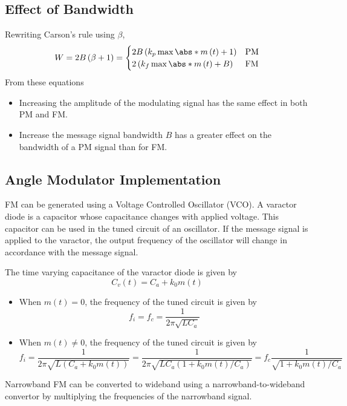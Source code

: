 \documentclass{article}
\begin{document}
\subsection{Effect of Bandwidth}
Rewriting Carson's rule using \(\beta\),
\begin{equation*}
    W = 2B \left( \beta + 1 \right) =
    \begin{cases}
        2B \left( k_p \max{\abs*{m\left( t \right)}} + 1 \right) & \text{PM} \\
        2 \left( k_f \max{\abs*{m\left( t \right)}} + B \right)  & \text{FM}
    \end{cases}
\end{equation*}
From these equations
\begin{itemize}
    \item Increasing the amplitude of the modulating signal has the
          same effect in both PM and FM.
    \item Increase the message signal bandwidth \(B\) has a greater
          effect on the bandwidth of a PM signal than for FM.
\end{itemize}
\subsection{Angle Modulator Implementation}
FM can be generated using a Voltage Controlled Oscillator (VCO). A
varactor diode is a capacitor whose capacitance changes with applied
voltage. This capacitor can be used in the tuned circuit of an
oscillator. If the message signal is applied to the varactor, the
output frequency of the oscillator will change in accordance with the
message signal.

The time varying capacitance of the varactor diode is given by
\begin{equation*}
    C_v\left( t \right) = C_a + k_0 m\left( t \right)
\end{equation*}
\begin{itemize}
    \item When \(m\left( t \right) = 0\), the frequency of the tuned
          circuit is given by
          \begin{equation*}
              f_i = f_c = \frac{1}{2 \pi \sqrt{L C_a}}
          \end{equation*}
    \item When \(m\left( t \right) \neq 0\), the frequency of the tuned
          circuit is given by
          \begin{equation*}
              f_i = \frac{1}{2 \pi \sqrt{L \left( C_a + k_0 m\left( t \right) \right)}} = \frac{1}{2 \pi \sqrt{L C_a \left( 1 + k_0 m\left( t \right) / C_a \right)}} = f_c \frac{1}{\sqrt{1 + k_0 m\left( t \right) / C_a}}
          \end{equation*}
\end{itemize}
Narrowband FM can be converted to wideband using a
narrowband-to-wideband convertor by multiplying the frequencies of the
narrowband signal.
\end{document}
